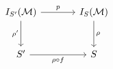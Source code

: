 \[\begin{tikzcd}[column sep=large,row sep=large]
I_{S'}(\mathcal M) \arrow[r,"p"] \arrow[d,"\rho'"'] & I_S(\mathcal M) \arrow[d,"\rho"]\\
S' \arrow[r,"\rho\circ f"'] & S
\end{tikzcd}\]
